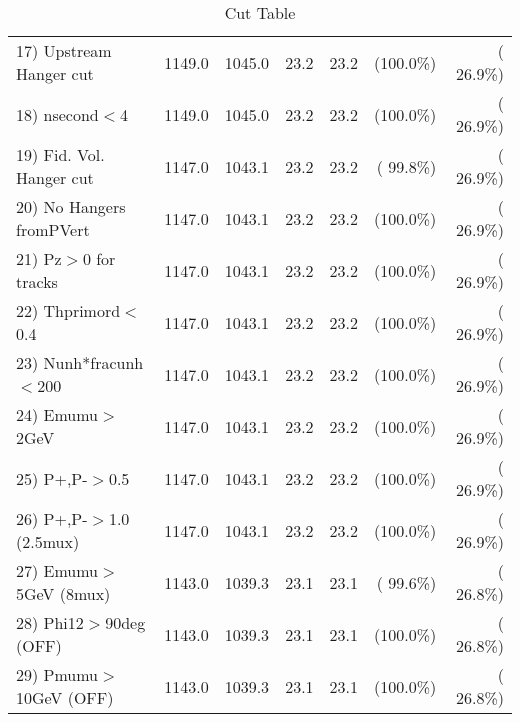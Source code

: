 \begin{table}[h!]
\begin{tabular}{||l||r|r|r|r|r|r||}
 17) Upstream Hanger cut  &       1149.0 &       1045.0 &         23.2 &         23.2 & (100.0\%) & ( 26.9\%) \\
 18) nsecond$<$4          &       1149.0 &       1045.0 &         23.2 &         23.2 & (100.0\%) & ( 26.9\%) \\
 19) Fid. Vol. Hanger cut &       1147.0 &       1043.1 &         23.2 &         23.2 & ( 99.8\%) & ( 26.9\%) \\
 20) No Hangers fromPVert &       1147.0 &       1043.1 &         23.2 &         23.2 & (100.0\%) & ( 26.9\%) \\
 21) Pz$>$0 for tracks    &       1147.0 &       1043.1 &         23.2 &         23.2 & (100.0\%) & ( 26.9\%) \\
 22) Thprimord$<$0.4      &       1147.0 &       1043.1 &         23.2 &         23.2 & (100.0\%) & ( 26.9\%) \\
 23) Nunh*fracunh$<$200   &       1147.0 &       1043.1 &         23.2 &         23.2 & (100.0\%) & ( 26.9\%) \\
 24) Emumu$>$2GeV         &       1147.0 &       1043.1 &         23.2 &         23.2 & (100.0\%) & ( 26.9\%) \\
 25) P+,P-$>$0.5          &       1147.0 &       1043.1 &         23.2 &         23.2 & (100.0\%) & ( 26.9\%) \\
 26) P+,P-$>$1.0 (2.5mux) &       1147.0 &       1043.1 &         23.2 &         23.2 & (100.0\%) & ( 26.9\%) \\
 27) Emumu$>$5GeV  (8mux) &       1143.0 &       1039.3 &         23.1 &         23.1 & ( 99.6\%) & ( 26.8\%) \\
 28) Phi12$>$90deg  (OFF) &       1143.0 &       1039.3 &         23.1 &         23.1 & (100.0\%) & ( 26.8\%) \\
 29) Pmumu$>$10GeV  (OFF) &       1143.0 &       1039.3 &         23.1 &         23.1 & (100.0\%) & ( 26.8\%) \\
 \hline
 \hline
 \end{tabular}
 \caption{Cut Table           }
 \label{tab-cutheavy_neutrino_1.000}
 \end{table}
